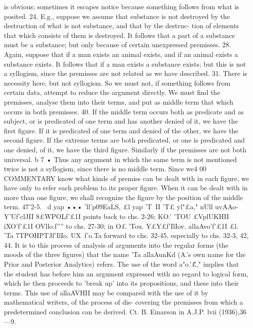 {{{{{{{{{{{{{{{{{{{{{{{{{{{is obvious; sometimes it escapes notice because something follows
from what is posited.
24. E.g., suppose we assume that substance is not destroyed by
the destruction of what is not substance, and that by the destruc-
tion of elements that which consists of them is destroyed. It
follows that a part of a substance must be a substance; but only
because of certain unexpressed premisses.
28. Again, suppose that if a man exists an animal exists, and
if an animal exists a substance exists. It follows that if a man
exists a substance exists; but this is not a syllogism, since the
premisses are not related as we have described.
31. There is necessity here, but not syllogism. So we must not,
if something follows from certain data, attempt to reduce the
argument directly. We must find the premisses, analyse them
into their terms, and put as middle term that which occurs in
both premisses.
40. If the middle term occurs both as predicate and as subject,
or is predicated of one term and has another denied of it, we have
the first figure. If it is predicated of one term and denied of the
other, we have the second figure. If the extreme terms are
both predicated, or one is predicated and one denied, of it, we
have the third figure. Similarly if the premisses are not both
universal.
b 7 • Thus any argument in which the same term is not mentioned
twice is not a syllogism, since there is no middle term. Since we4 00
COMMENTARY
know what kinds of premiss can be dealt with in each figure, we
have only to refer each problem to its proper figure. When it can
be dealt with in more than one figure, we shall recognize the figure
by the position of the middle term.
47'2-5. ~d yap ••• 'll'p09EaLS, £l yap 'T~II 'T£ yl"£a," nUll uvAAo-
Y'Uf'clJII 8£WPOLf'£1I points back to chs. 2-26; KO.' 'TOU £VplUKHII iXO'f'£1I
OVllo.f'''' to chs. 27-30; in O£ 'Tou. Y£Y£\IT}f'IlIov. allaAvo'f'£1I £l. 'Ta
7TPOHPTJf'IlIo. UX~f'o.Ta forward to chs. 32-45, especially to chs.
32-3, 42, 44. It is to this process of analysis of arguments into
the regular forms (the moods of the three figures) that the name
'Ta allaAunKd (A.'s own name for the Prior and Posterior Analytics)
refers. The use of the word a"o.'\v£," implies that the student has
before him an argument expressed with no regard to logical form,
which he then proceeds to 'break up' into its propositions, and
these into their terms. This use of allaAVHII may be compared
with the use of it by mathematical writers, of the process of dis-
covering the premisses from which a predetermined conclusion
can be derived. Ct. B. Einarson in A.J.P. lvii (1936),36---9.
}}}}}}}}}}}}}}}}}}}}}}}}}}
